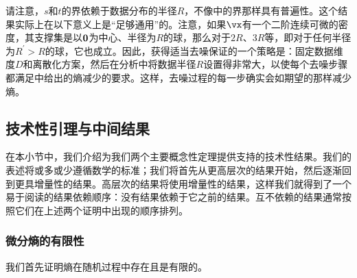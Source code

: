 \documentclass[../../book-main_zh.tex]{subfiles}
\begin{document}
请注意，\(s\)和\(t\)的界依赖于数据分布的半径\(R\)，不像中的界那样具有普遍性。这个结果实际上在以下意义上是“足够通用”的。注意，如果\(\vx\)有一个二阶连续可微的密度，其支撑集是以\(\bm{0}\)为中心、半径为\(R\)的球，那么对于\(2R\)、\(3R\)等，即对于任何半径为\(R^{\prime} > R\)的球，它也成立。因此，获得适当去噪保证的一个策略是：固定数据维度\(D\)和离散化方案，然后在分析中将数据半径\(R\)设置得非常大，以使每个去噪步骤都满足中给出的熵减少的要求。这样，去噪过程的每一步确实会如期望的那样减少熵。

 
\subsection{技术性引理与中间结果}\label{sub:app_diffusion_intermediate_results}

在本小节中，我们介绍为我们两个主要概念性定理提供支持的技术性结果。我们的表述将或多或少遵循数学的标准；我们将首先从更高层次的结果开始，然后逐渐回到更具增量性的结果。高层次的结果将使用增量性的结果，这样我们就得到了一个易于阅读的结果依赖顺序：没有结果依赖于它之前的结果。互不依赖的结果通常按照它们在上述两个证明中出现的顺序排列。


\subsubsection{微分熵的有限性}

我们首先证明熵在随机过程中存在且是有限的。
\end{document}
